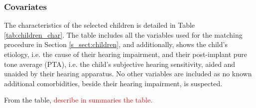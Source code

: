 \subsubsection{Covariates} \label{ss_sect:covariates}
%
The characteristics of the selected children is detailed in Table \ref{tab:children_char}. The table includes all the variables used for the matching procedure in Section \ref{s_sect:children}, and additionally, shows the child's etiology, i.e. the cause of their hearing impairment, and their post-implant pure tone average (PTA), i.e. the child's subjective hearing sensitivity, aided and unaided by their hearing apparatus. No other variables are included as no known additional comorbidities, beside their hearing impairment, is suspected.

From the table, \textcolor{red}{describe in summaries the table.} 
	
